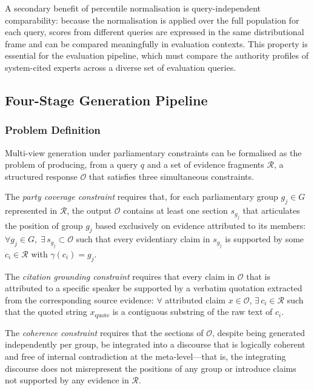 A secondary benefit of percentile normalisation is query-independent comparability: because
the normalisation is applied over the full population for each query, scores from different
queries are expressed in the same distributional frame and can be compared meaningfully in
evaluation contexts. This property is essential for the evaluation pipeline, which must compare
the authority profiles of system-cited experts across a diverse set of evaluation queries.


\subsection{Four-Stage Generation Pipeline}
\label{sec:generation-pipeline}

\subsubsection{Problem Definition}

Multi-view generation under parliamentary constraints can be formalised as the problem of
producing, from a query $q$ and a set of evidence fragments $\mathcal{R}$, a structured
response $\mathcal{O}$ that satisfies three simultaneous constraints.

The \textit{party coverage constraint} requires that, for each parliamentary group $g_j \in G$
represented in $\mathcal{R}$, the output $\mathcal{O}$ contains at least one section $s_{g_j}$
that articulates the position of group $g_j$ based exclusively on evidence attributed to its
members: $\forall g_j \in G,\; \exists\, s_{g_j} \subset \mathcal{O}$ such that every
evidentiary claim in $s_{g_j}$ is supported by some $c_i \in \mathcal{R}$ with
$\gamma(c_i) = g_j$.

The \textit{citation grounding constraint} requires that every claim in $\mathcal{O}$ that is
attributed to a specific speaker be supported by a verbatim quotation extracted from the
corresponding source evidence: $\forall$ attributed claim $x \in \mathcal{O}$, $\exists\, c_i
\in \mathcal{R}$ such that the quoted string $x_\text{quote}$ is a contiguous substring of the
raw text of $c_i$.

The \textit{coherence constraint} requires that the sections of $\mathcal{O}$, despite being
generated independently per group, be integrated into a discourse that is logically coherent
and free of internal contradiction at the meta-level---that is, the integrating discourse does
not misrepresent the positions of any group or introduce claims not supported by any evidence
in $\mathcal{R}$.

